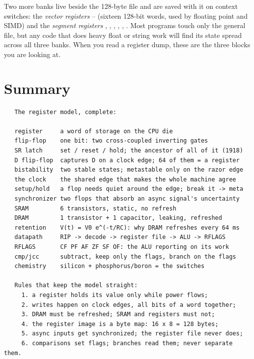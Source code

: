 Two more banks live beside the 128-byte file and are saved with it on
context switches: the \emph{vector registers} --
(sixteen 128-bit words, used by floating point and SIMD) and the
\emph{segment registers} , , , ,
, . Most programs touch only the general file, but
any code that does heavy float or string work will find its state
spread across all three banks. When you read a register dump, these
are the three blocks you are looking at.

\section{Summary}

\begin{verbatim}
   The register model, complete:

   register     a word of storage on the CPU die
   flip-flop    one bit: two cross-coupled inverting gates
   SR latch     set / reset / hold; the ancestor of all of it (1918)
   D flip-flop  captures D on a clock edge; 64 of them = a register
   bistability  two stable states; metastable only on the razor edge
   the clock    the shared edge that makes the whole machine agree
   setup/hold   a flop needs quiet around the edge; break it -> meta
   synchronizer two flops that absorb an async signal's uncertainty
   SRAM         6 transistors, static, no refresh
   DRAM         1 transistor + 1 capacitor, leaking, refreshed
   retention    V(t) = V0 e^(-t/RC): why DRAM refreshes every 64 ms
   datapath     RIP -> decode -> register file -> ALU -> RFLAGS
   RFLAGS       CF PF AF ZF SF OF: the ALU reporting on its work
   cmp/jcc      subtract, keep only the flags, branch on the flags
   chemistry    silicon + phosphorus/boron = the switches

   Rules that keep the model straight:
     1. a register holds its value only while power flows;
     2. writes happen on clock edges, all bits of a word together;
     3. DRAM must be refreshed; SRAM and registers must not;
     4. the register image is a byte map: 16 x 8 = 128 bytes;
     5. async inputs get synchronized; the register file never does;
     6. comparisons set flags; branches read them; never separate them.
\end{verbatim}

